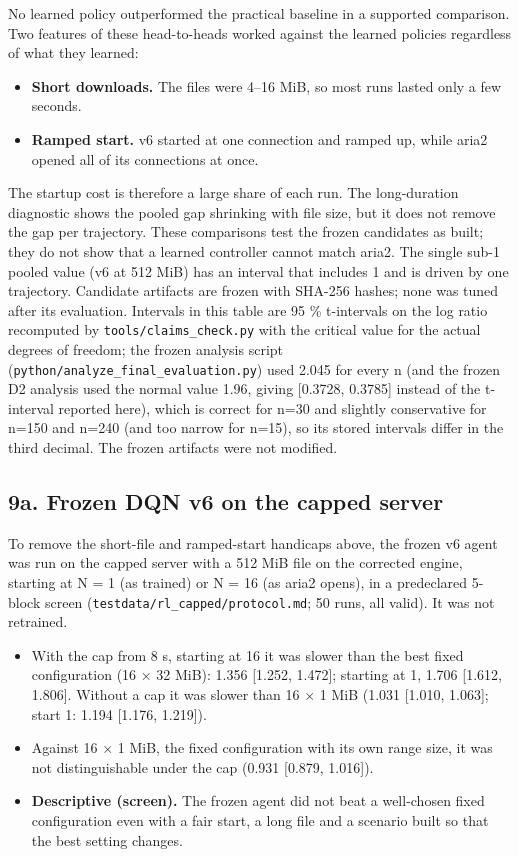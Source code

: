 \documentclass{ieeeaccess}
\begin{document}
No learned policy outperformed the practical baseline in a supported comparison. Two features of these head-to-heads worked against the learned policies regardless of what they learned:

\begin{itemize}
\item \textbf{Short downloads.} The files were 4–16 MiB, so most runs lasted only a few seconds.
\item \textbf{Ramped start.} v6 started at one connection and ramped up, while aria2 opened all of its connections at once.
\end{itemize}

The startup cost is therefore a large share of each run. The long-duration diagnostic shows the pooled gap shrinking with file size, but it does not remove the gap per trajectory. These comparisons test the frozen candidates as built; they do not show that a learned controller cannot match aria2. The single sub-1 pooled value (v6 at 512 MiB) has an interval that includes 1 and is driven by one trajectory. Candidate artifacts are frozen with SHA-256 hashes; none was tuned after its evaluation. Intervals in this table are 95 \% t-intervals on the log ratio recomputed by \texttt{tools/\allowbreak{}claims\_check.py} with the critical value for the actual degrees of freedom; the frozen analysis script (\texttt{python/\allowbreak{}analyze\_final\_evaluation.py}) used 2.045 for every n (and the frozen D2 analysis used the normal value 1.96, giving [0.3728, 0.3785] instead of the t-interval reported here), which is correct for n=30 and slightly conservative for n=150 and n=240 (and too narrow for n=15), so its stored intervals differ in the third decimal. The frozen artifacts were not modified.


\subsection*{9a. Frozen DQN v6 on the capped server}

To remove the short-file and ramped-start handicaps above, the frozen v6 agent was run on the capped server with a 512 MiB file on the corrected engine, starting at N = 1 (as trained) or N = 16 (as aria2 opens), in a predeclared 5-block screen (\texttt{testdata/\allowbreak{}rl\_capped/\allowbreak{}protocol.md}; 50 runs, all valid). It was not retrained.


\begin{itemize}
\item With the cap from 8 s, starting at 16 it was slower than the best fixed configuration (16 × 32 MiB): 1.356 [1.252, 1.472]; starting at 1, 1.706 [1.612, 1.806]. Without a cap it was slower than 16 × 1 MiB (1.031 [1.010, 1.063]; start 1: 1.194 [1.176, 1.219]).
\item Against 16 × 1 MiB, the fixed configuration with its own range size, it was not distinguishable under the cap (0.931 [0.879, 1.016]).
\item \textbf{Descriptive (screen).} The frozen agent did not beat a well-chosen fixed configuration even with a fair start, a long file and a scenario built so that the best setting changes.
\end{itemize}
\end{document}
